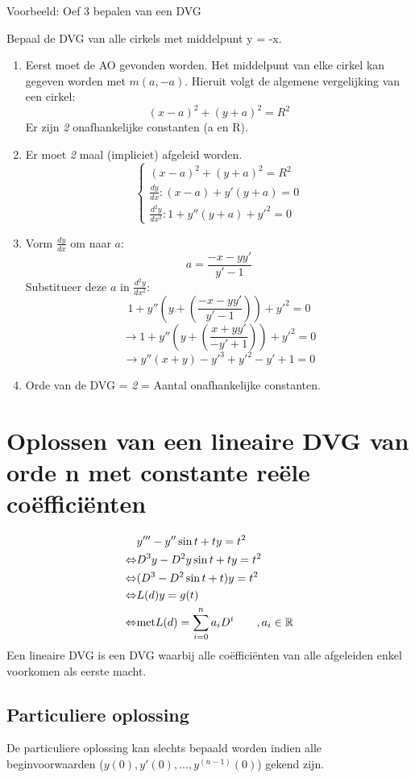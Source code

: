 \documentclass[12pt]{report}
\newcommand{\example}[2]{
    \hrulefill
    
    Voorbeeld: #1
    
    #2
    
    \hrulefill
}
\begin{document}
\example{Oef 3 bepalen van een DVG}
{
Bepaal de DVG van alle cirkels met middelpunt y = -x.
\begin{enumerate}
\item Eerst moet de AO gevonden worden. Het middelpunt van elke cirkel kan gegeven worden met $m(a, -a).$
    Hieruit volgt de algemene vergelijking van een cirkel: $$(x - a)^2 + (y + a)^2 = R^2$$
    Er zijn \textit{2} onafhankelijke constanten (a en R).
\item Er moet \textit{2} maal (impliciet) afgeleid worden.
\[
    \begin{cases}
    (x - a)^2 + (y + a)^2 = R^2 \\
    \frac{dy}{dx} : (x-a) + y'(y+a) = 0 \\
    \frac{d^2y}{dx^2} : 1 + y''(y + a) + y'^2 = 0
    \end{cases}
\]
\item
    Vorm $\frac{dy}{dx}$ om naar $a$:
    $$a = \frac{-x - yy'}{y' - 1}$$
    Substitueer deze $a$ in $\frac{d^2y}{dx^2}$:
    $$1 + y''(y + (\frac{-x - yy'}{y' - 1})) + y'^2 = 0$$
    $$\rightarrow 1 + y''(y + (\frac{x + yy'}{-y' + 1})) + y'^2 = 0$$
    $$\rightarrow y''(x + y) - y'^3 + y'^2 - y' + 1 = 0$$
\item Orde van de DVG = \textit{2}  = Aantal onafhankelijke constanten.
\end{enumerate}
}
\section{Oplossen van een lineaire DVG van orde n met constante reële coëfficiënten}
\begin{equation*}
 \begin{split}
		  & y''' - y''\sin t + ty = t^2 \\
  \Leftrightarrow & D^3y - D^2y\sin t + ty = t^2 \\
  \Leftrightarrow & (D^3 - D^2\sin t + t)y = t^2 \\
  \Leftrightarrow & L(d)y = g(t) \\
  \Leftrightarrow & \hbox{met} L(d) = \sum_{i = 0}^{n} a_iD^i \qquad ,a_i \in \mathbb{R}
 \end{split}
\end{equation*}
Een lineaire DVG is een DVG waarbij alle coëfficiënten van alle afgeleiden enkel voorkomen als eerste macht.
\subsection{Particuliere oplossing}
De particuliere oplossing kan slechts bepaald worden indien alle beginvoorwaarden ($y(0), y'(0),...,y^{(n-1)}(0)$) gekend zijn.
\end{document}
